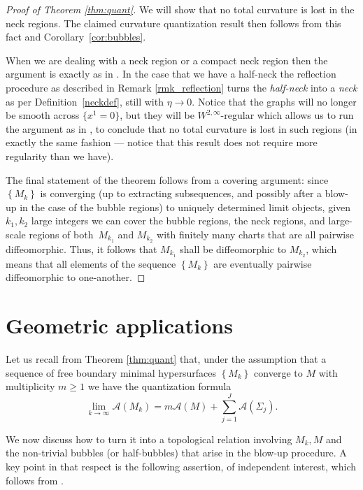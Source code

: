 \documentclass[JEP,XML,SOM,Unicode]{cedram}
\let\mathcal\mathscr
\newcounter{cas}
\theoremstyle{definition}
\begin{document}
\begin{proof}[Proof of Theorem \ref{thm:quant}]
We will show that no total curvature is lost in the neck regions. The claimed curvature quantization result then follows from this fact and Corollary~\ref{cor:bubbles}.

When we are dealing with a neck region or a compact neck region then the argument is exactly as in \cite[p.\,4392--4395]{BS17}. In the case that we have a half-neck the reflection procedure as described in Remark \ref{rmk_reflection} turns the \emph{half-neck} into a \emph{neck} as per Definition~\ref{neckdef}, still with $\eta \to 0$. Notice that the graphs will no longer be smooth across $\{x^1 =0\}$, but they will be $W^{2,\infty}$-regular which allows us to run the argument as in \hbox{\cite[p.\,4392--4395]{BS17}}, to conclude that no total curvature is lost in such regions (in exactly the same fashion --- notice that this result does not require more regularity than we have).

The final statement of the theorem follows from a covering argument: since $\left\{M_k\right\}$ is converging (up to extracting subsequences, and possibly after a blow-up in the case of the bubble regions) to uniquely determined limit objects, given $k_1, k_2$ large integers we can cover the bubble regions, the neck regions, and large-scale regions of both~$M_{k_1}$ and $M_{k_2}$ with finitely many charts that are all pairwise diffeomorphic. Thus, it follows that $M_{k_1}$ shall be diffeomorphic to $M_{k_2}$, which means that all elements of the sequence $\left\{M_k\right\}$ are eventually pairwise diffeomorphic to one-another.
\end{proof}

\section{Geometric applications}\label{sec:appl}

Let us recall from Theorem \ref{thm:quant} that, under the assumption that a sequence of free boundary minimal hypersurfaces $\left\{M_k \right\}$ converge to $M$ with multiplicity $m\geq 1$ we have the quantization formula
\[
\lim_{k\to\infty}\mathcal{A}(M_k) =m\mathcal{A}(M)+ \sum_{j=1}^J\mathcal{A}(\Sigma_j).
\]

We now discuss how to turn it into a topological relation involving $M_k, M$ and the non-trivial bubbles (or half-bubbles) that arise in the blow-up procedure. A key point in that respect is the following assertion, of independent interest, which follows from \cite[Th.\,29]{ACS17}.
\end{document}
